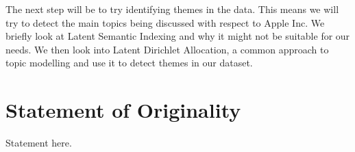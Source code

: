 The next step will be to try identifying themes in the data. This means we will try to detect the
main topics being discussed with respect to Apple Inc. We briefly look at Latent Semantic Indexing
and why it might not be suitable for our needs. We then look into Latent Dirichlet Allocation, a
common approach to topic modelling and use it to detect themes in our dataset.


\section{Statement of Originality}

Statement here.

